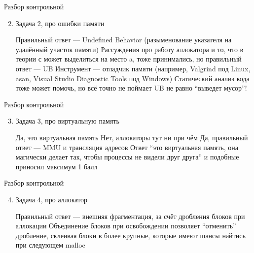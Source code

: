 \documentclass{../../slides-style}
\begin{document}
    \begin{frame}{Разбор контрольной}
        \begin{enumerate}
            \setcounter{enumi}{1}
            \item Задача 2, про ошибки памяти
            \begin{outline}
                \1 Правильный ответ --- Undefined Behavior (разыменование указателя на удалённый участок памяти)
                \1 Рассуждения про работу аллокатора и то, что в теории с может выделиться на место a, тоже принимались, но правильный ответ --- UB
                \1 Инструмент --- отладчик памяти (например, Valgrind под Linux, asan, Visual Studio Diagnostic Tools под Windows)
                    \2 Статический анализ кода тоже может помочь, но всё точно не поймает
                \1 UB не равно \enquote{выведет мусор}!
            \end{outline}
        \end{enumerate}
    \end{frame}

        \begin{frame}{Разбор контрольной}
        \begin{enumerate}
            \setcounter{enumi}{2}
            \item Задача 3, про виртуальную память
            \begin{outline}
                \1 Да, это виртуальная память
                \1 Нет, аллокаторы тут ни при чём
                \1 Да, правильный ответ --- MMU и трансляция адресов
                    \2 Ответ \enquote{это виртуальная память, она магически делает так, чтобы процессы не видели друг друга} и подобные приносил максимум 1 балл
            \end{outline}
        \end{enumerate}
    \end{frame}

        \begin{frame}{Разбор контрольной}
        \begin{enumerate}
            \setcounter{enumi}{3}
            \item Задача 4, про аллокатор
            \begin{outline}
                \1 Правильный ответ --- внешняя фрагментация, за счёт дробления блоков при аллокации
                \1 Объединение блоков при освобождении позволяет \enquote{отменить} дробление, склеивая блоки в более крупные, которые имеют шансы найтись при следующем malloc
            \end{outline}
        \end{enumerate}
    \end{frame}
\end{document}
